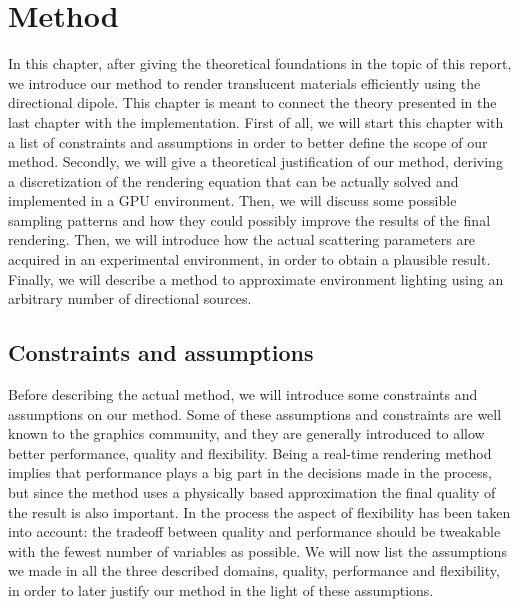 \chapter{Method}
In this chapter, after giving the theoretical foundations in the topic of this report, we introduce our method to render translucent materials efficiently using the directional dipole. This chapter is meant to connect the theory presented in the last chapter with the implementation. First of all, we will start this chapter with a list of constraints and assumptions in order to better define the scope of our method. Secondly, we will give a theoretical justification of our method, deriving a discretization of the rendering equation that can be actually solved and implemented in a GPU environment. Then, we will discuss some possible sampling patterns and how they could possibly improve the results of the final rendering. Then, we will introduce how the actual scattering parameters are acquired in an experimental environment, in order to obtain a plausible result. Finally, we will describe a method to approximate environment lighting using an arbitrary number of directional sources.

\section{Constraints and assumptions}

Before describing the actual method, we will introduce some constraints and assumptions on our method. Some of these assumptions and constraints are well known to the graphics community, and they are generally introduced to allow better performance, quality and flexibility. Being a real-time rendering method implies that performance plays a big part in the decisions made in the process, but since the method uses a physically based approximation the final quality of the result is also important. In the process the aspect of flexibility has been taken into account: the tradeoff between quality and performance should be tweakable with the fewest number of variables as possible. We will now list the assumptions we made in all the three described domains, quality, performance and flexibility, in order to later justify our method in the light of these assumptions. 

